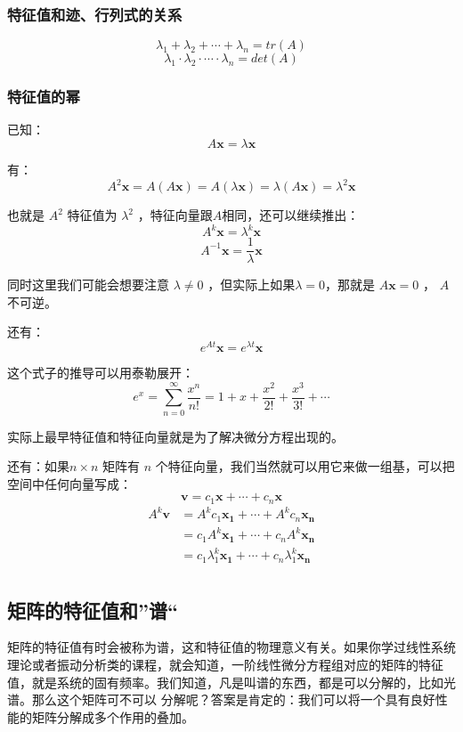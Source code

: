 \documentclass[12pt]{article}
\begin{document}
\subsubsection{特征值和迹、行列式的关系}
$$
\lambda_1 + \lambda_2 + \cdots + \lambda_n = tr(A)
$$
$$
\lambda_1 \cdot \lambda_2 \cdot \cdots \cdot \lambda_n = det(A)
$$

\subsubsection{特征值的幂}
已知：
$$
A\mathbf{x} = \lambda\mathbf{x}
$$

有：
$$
A^2\mathbf{x} = A(A\mathbf{x}) = A(\lambda\mathbf{x}) = \lambda(A\mathbf{x}) = \lambda^2\mathbf{x}
$$

也就是 $A^2$ 特征值为 $\lambda^2$ ，特征向量跟$A$相同，还可以继续推出：
$$
A^k\mathbf{x} = \lambda^k\mathbf{x}
$$
$$
A^{-1}\mathbf{x} = \frac{1}{\lambda}\mathbf{x}
$$

同时这里我们可能会想要注意 $\lambda \ne 0$ ，但实际上如果$\lambda = 0$，那就是 $A\mathbf{x} = 0$ ， $A$不可逆。

还有：
$$
e^{At}\mathbf{x} = e^{\lambda t}\mathbf{x}
$$

这个式子的推导可以用泰勒展开：
$$
e^x = \sum_{n=0}^{\infty}\frac{x^n}{n!} = 1 + x + \frac{x^2}{2!} + \frac{x^3}{3!} + \cdots
$$

实际上最早特征值和特征向量就是为了解决微分方程出现的。

还有：如果$n \times n$ 矩阵有 $n$ 个特征向量，我们当然就可以用它来做一组基，可以把空间中任何向量写成：
$$
\mathbf{v} = c_1\mathbf{x} + \cdots + c_n\mathbf{x}
$$
\begin{align*}
A^k\mathbf{v} &= A^kc_1\mathbf{x_1} + \cdots + A^kc_n\mathbf{x_n} \\
    &= c_1A^k\mathbf{x_1} + \cdots + c_nA^k\mathbf{x_n} \\
   &= c_1\lambda_1^k\mathbf{x_1} + \cdots + c_n\lambda_1^k\mathbf{x_n} \\
\end{align*}


\subsection{矩阵的特征值和”谱“\cite{Fantastic_Matrix_1}}
矩阵的特征值有时会被称为谱，这和特征值的物理意义有关。如果你学过线性系统理论或者振动分析类的课程，就会知道，一阶线性微分方程组对应的矩阵的特征值，就是系统的固有频率。我们知道，凡是叫谱的东西，都是可以分解的，比如光谱。那么这个矩阵可不可以 分解呢？答案是肯定的：我们可以将一个具有良好性能的矩阵分解成多个作用的叠加。
\end{document}

